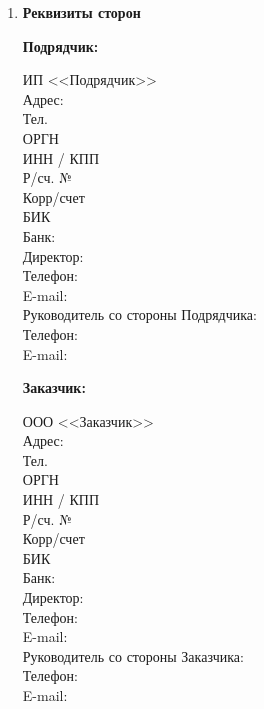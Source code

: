 \documentclass[14pt,a4paper]{article}
\begin{document}
\begin{enumerate}
	\item
	\begin{center}
	\textbf{Реквизиты сторон}
	\end{center}
	\begin{minipage}{\textwidth}
	\begin{minipage}{0.5\textwidth}
	\begin{flushleft}
	\begin{center}
	\textbf{Подрядчик:}\\
	\end{center}
	ИП <<Подрядчик>> \\
	Адрес:\\
	Тел.\\
	ОРГН\\
	ИНН / КПП\\
	Р/сч. №\\
	Корр/счет\\
	БИК\\
	Банк:\\
	\vspace{\baselineskip}
	Директор:\\
	Телефон:\\
	E-mail:\\
	\vspace{\baselineskip}
	Руководитель со стороны Подрядчика:\\
	Телефон:\\
	E-mail:\\
	\end{flushleft}
	\end{minipage}
	\begin{minipage}{0.5\textwidth}
	\begin{flushleft}
	\begin{center}
	\textbf{Заказчик:}\\
	\end{center}
	ООО <<Заказчик>>\\
	Адрес:\\
	Тел.\\
	ОРГН\\
	ИНН / КПП\\
	Р/сч. №\\
	Корр/счет\\
	БИК\\
	Банк:\\
	\vspace{\baselineskip}
	Директор:\\
	Телефон:\\
	E-mail:\\
	\vspace{\baselineskip}
	Руководитель со стороны Заказчика:\\
	Телефон:\\
	E-mail:\\


\end{flushleft}
\end{minipage}
\end{minipage}
\end{enumerate}
\end{document}
